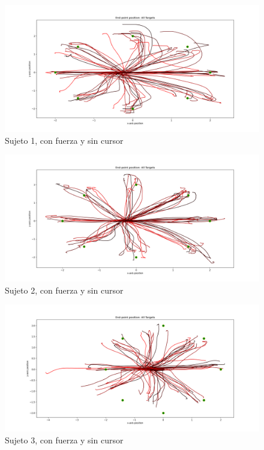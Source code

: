 \documentclass[a4paper,11pt, oneside]{book}
\begin{document}
\begin{figure}[H]
	\includegraphics[width=\linewidth]{sujeto1/force_no_cursor/trayectorias}
	\caption{Sujeto 1, con  fuerza y sin cursor}
	\label{1-4-0}
\end{figure}
\begin{figure}[H]
	\includegraphics[width=\linewidth]{sujeto2/force_no_cursor/trayectorias}
	\caption{Sujeto 2, con  fuerza y sin cursor}
	\label{2-4-0}
\end{figure}
\begin{figure}[H]
	\includegraphics[width=\linewidth]{sujeto3/force_no_cursor/trayectorias}
	\caption{Sujeto 3, con  fuerza y sin cursor}
	\label{3-4-0}
\end{figure}
\end{document}
